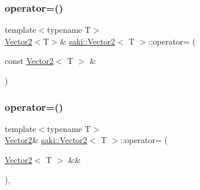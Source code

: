 \mbox{\label{classsaki_1_1_vector2_ae6ee2a6387bfe58bdd5bf74d388370a9}} 
\subsubsection{\texorpdfstring{operator=()}{operator=()}\hspace{0.1cm}{\footnotesize\ttfamily [1/2]}}
{\footnotesize\ttfamily template$<$typename T$>$ \\
\mbox{\hyperlink{classsaki_1_1_vector2}{Vector2}}$<$T$>$\& \mbox{\hyperlink{classsaki_1_1_vector2}{saki\+::\+Vector2}}$<$ T $>$\+::operator= (\begin{DoxyParamCaption}\item[{const \mbox{\hyperlink{classsaki_1_1_vector2}{Vector2}}$<$ T $>$ \&}]{ }\end{DoxyParamCaption})\hspace{0.3cm}{\ttfamily [default]}}

\mbox{\label{classsaki_1_1_vector2_a5cc432dc740f218177bd028a5899939f}} 
\subsubsection{\texorpdfstring{operator=()}{operator=()}\hspace{0.1cm}{\footnotesize\ttfamily [2/2]}}
{\footnotesize\ttfamily template$<$typename T$>$ \\
\mbox{\hyperlink{classsaki_1_1_vector2}{Vector2}}\& \mbox{\hyperlink{classsaki_1_1_vector2}{saki\+::\+Vector2}}$<$ T $>$\+::operator= (\begin{DoxyParamCaption}\item[{\mbox{\hyperlink{classsaki_1_1_vector2}{Vector2}}$<$ T $>$ \&\&}]{ }\end{DoxyParamCaption})\hspace{0.3cm}{\ttfamily [default]}, {\ttfamily [noexcept]}}

\mbox{\label{classsaki_1_1_vector2_aab01bab2f3691da2a9898d4cc8f26919}} 
